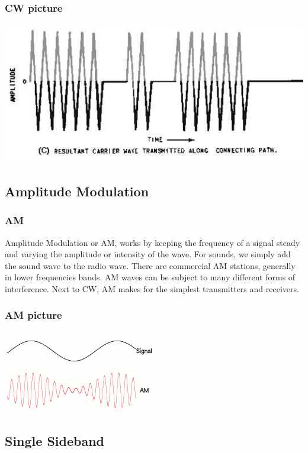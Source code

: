 \documentclass[10pt]{beamer}
\begin{document}
\begin{frame}
\frametitle{CW picture}
\includegraphics[height=.5\textheight]{cw.png}
\end{frame}

\subsection{Amplitude Modulation}

\begin{frame}
\frametitle{AM}
Amplitude Modulation or AM, works by keeping the frequency of a signal steady and varying the amplitude or intensity of the wave. For sounds, we simply add the sound wave to the radio wave. There are commercial AM stations, generally in lower frequencies bands. AM waves can be subject to many different forms of interference. Next to CW, AM makes for the simplest transmitters and receivers.
\end{frame}

\begin{frame}
\frametitle{AM picture}
\includegraphics[height=.5\textheight]{am.png}
\end{frame}

\subsection{Single Sideband}
\end{document}
